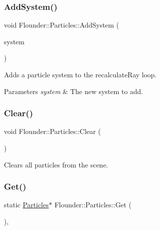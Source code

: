 \subsubsection{\texorpdfstring{Add\+System()}{AddSystem()}}
{\footnotesize\ttfamily void Flounder\+::\+Particles\+::\+Add\+System (\begin{DoxyParamCaption}\item[{\hyperlink{class_flounder_1_1_particle_system}{Particle\+System} $\ast$}]{system }\end{DoxyParamCaption})}



Adds a particle system to the recalculate\+Ray loop. 


\begin{DoxyParams}{Parameters}
{\em system} & The new system to add. \\
\hline
\end{DoxyParams}
\mbox{\label{class_flounder_1_1_particles_af0944c0f48a6868c19e9116287a5b44b}} 
\subsubsection{\texorpdfstring{Clear()}{Clear()}}
{\footnotesize\ttfamily void Flounder\+::\+Particles\+::\+Clear (\begin{DoxyParamCaption}{ }\end{DoxyParamCaption})}



Clears all particles from the scene. 

\mbox{\label{class_flounder_1_1_particles_a64689324a6a1b05df2a58aa403b7d49c}} 
\subsubsection{\texorpdfstring{Get()}{Get()}}
{\footnotesize\ttfamily static \hyperlink{class_flounder_1_1_particles}{Particles}$\ast$ Flounder\+::\+Particles\+::\+Get (\begin{DoxyParamCaption}{ }\end{DoxyParamCaption})\hspace{0.3cm}{\ttfamily [inline]}, {\ttfamily [static]}}



